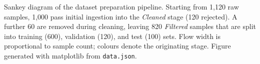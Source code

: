 \caption{Sankey diagram of the dataset preparation pipeline. Starting from 1{,}120 raw samples, 1{,}000 pass initial ingestion into the \textit{Cleaned} stage (120 rejected). A further 60 are removed during cleaning, leaving 820 \textit{Filtered} samples that are split into training (600), validation (120), and test (100) sets. Flow width is proportional to sample count; colours denote the originating stage. Figure generated with matplotlib from \texttt{data.json}.}
